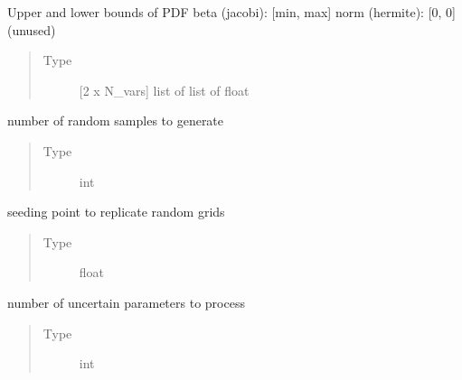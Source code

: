 \documentclass[letterpaper,10pt,english,openany,oneside]{sphinxmanual}
\begin{document}
\begin{fulllineitems}

\begin{fulllineitems}
\label{\detokenize{pygpc:pygpc.grid.RandomGrid.limits}}
Upper and lower bounds of PDF
beta (jacobi):  {[}min, max{]}
norm (hermite): {[}0, 0{]} (unused)
\begin{quote}\begin{description}
\item[{Type}] \leavevmode
{[}2 x N\_vars{]} list of list of float

\end{description}\end{quote}

\end{fulllineitems}


\begin{fulllineitems}
\label{\detokenize{pygpc:pygpc.grid.RandomGrid.N}}
number of random samples to generate
\begin{quote}\begin{description}
\item[{Type}] \leavevmode
int

\end{description}\end{quote}

\end{fulllineitems}


\begin{fulllineitems}
\label{\detokenize{pygpc:pygpc.grid.RandomGrid.seed}}
seeding point to replicate random grids
\begin{quote}\begin{description}
\item[{Type}] \leavevmode
float

\end{description}\end{quote}

\end{fulllineitems}


\begin{fulllineitems}
\label{\detokenize{pygpc:pygpc.grid.RandomGrid.dim}}
number of uncertain parameters to process
\begin{quote}\begin{description}
\item[{Type}] \leavevmode
int


\end{description}
\end{quote}
\end{fulllineitems}
\end{fulllineitems}
\end{document}
